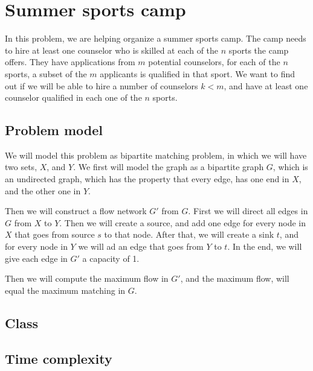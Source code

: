 \documentclass{article}
\begin{document}
\section*{Summer sports camp}

In this problem, we are helping organize a summer sports camp. The camp needs to hire at least one counselor who is skilled at each of the $n$ sports the camp offers. They have applications from $m$ potential counselors, for each of the $n$ sports, a subset of the $m$ applicants is qualified in that sport. We want to find out if we will be able to hire a number of counselors $k<m$, and have at least one counselor qualified in each one of the $n$ sports. 

\subsection*{Problem model}

We will model this problem as bipartite matching problem, in which we will have two sets, $X$, and $Y$. We first will model the graph as a bipartite graph $G$, which is an undirected graph, which has the property that every edge, has one end in $X$, and the other one in $Y$.

Then we will construct a flow network $G'$ from $G$. First we will direct all edges in $G$ from $X$ to $Y$. Then we will create a source, and add one edge for every node in $X$ that goes from source $s$ to that node. After that, we will create a sink $t$, and for every node in $Y$ we will ad an edge that goes from $Y$ to $t$. In the end, we will give each edge in $G'$ a capacity of 1.

Then we will compute the maximum flow in $G'$, and the maximum flow, will equal the maximum matching in $G$.

\subsection*{Class}

\subsection*{Time complexity}
\end{document}
